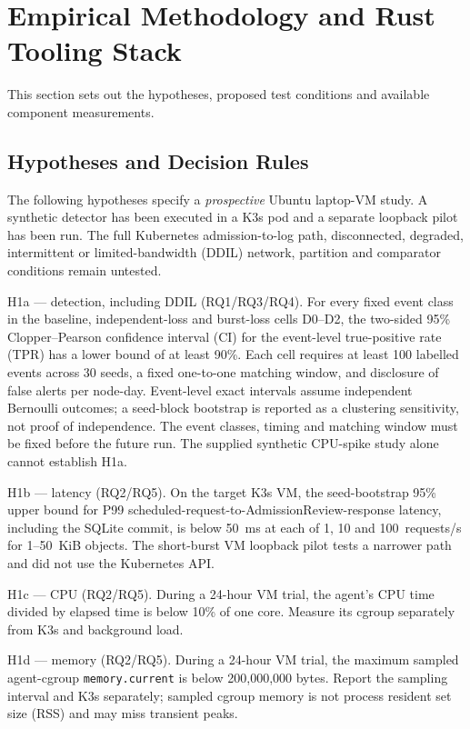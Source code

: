 \documentclass{ieeeaccess}
\renewcommand{\textbf}[1]{#1}
\begin{document}


\section{Empirical Methodology and Rust Tooling Stack}
\label{sec:methodology}

This section sets out the hypotheses, proposed test conditions and available component measurements.

\subsection{Hypotheses and Decision Rules}
\label{subsec:hypothesis}

The following hypotheses specify a \emph{prospective} Ubuntu laptop-VM study. A synthetic detector has been executed in a K3s pod and a separate loopback pilot has been run. The full Kubernetes admission-to-log path, disconnected, degraded, intermittent or limited-bandwidth (DDIL) network, partition and comparator conditions remain untested.

\noindent\textbf{H1a --- detection, including DDIL (RQ1/RQ3/RQ4).} For every fixed event class in the baseline, independent-loss and burst-loss cells D0--D2, the two-sided 95\% Clopper--Pearson confidence interval (CI) for the event-level true-positive rate (TPR) has a lower bound of at least 90\%. Each cell requires at least 100 labelled events across 30 seeds, a fixed one-to-one matching window, and disclosure of false alerts per node-day. Event-level exact intervals assume independent Bernoulli outcomes; a seed-block bootstrap is reported as a clustering sensitivity, not proof of independence. The event classes, timing and matching window must be fixed before the future run. The supplied synthetic CPU-spike study alone cannot establish H1a.

\noindent\textbf{H1b --- latency (RQ2/RQ5).} On the target K3s VM, the seed-bootstrap 95\% upper bound for P99 scheduled-request-to-AdmissionReview-response latency, including the SQLite commit, is below 50~ms at each of 1, 10 and 100~requests/s for 1--50~KiB objects. The short-burst VM loopback pilot tests a narrower path and did not use the Kubernetes API.

\noindent\textbf{H1c --- CPU (RQ2/RQ5).} During a 24-hour VM trial, the agent's CPU time divided by elapsed time is below 10\% of one core. Measure its cgroup separately from K3s and background load.

\noindent\textbf{H1d --- memory (RQ2/RQ5).} During a 24-hour VM trial, the maximum sampled agent-cgroup \texttt{memory.current} is below 200,000,000 bytes. Report the sampling interval and K3s separately; sampled cgroup memory is not process resident set size (RSS) and may miss transient peaks.
\end{document}
